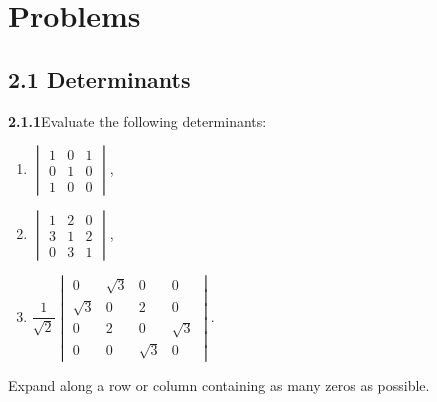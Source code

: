 
\section*{Problems}

\subsection*{2.1 Determinants}

\par\bigskip
\noindent\textbf{2.1.1}\quad Evaluate the following determinants:
\begin{enumerate}
\item[(a)] $\begin{vmatrix}1&0&1\\0&1&0\\1&0&0\end{vmatrix}$,\quad
\item[(b)] $\begin{vmatrix}1&2&0\\3&1&2\\0&3&1\end{vmatrix}$,\quad
\item[(c)] $\dfrac{1}{\sqrt{2}}\begin{vmatrix}
  0&\sqrt{3}&0&0\\ \sqrt{3}&0&2&0\\ 0&2&0&\sqrt{3}\\
  0&0&\sqrt{3}&0\end{vmatrix}$.
\end{enumerate}
\solution
Expand along a row or column containing as many zeros as possible.

